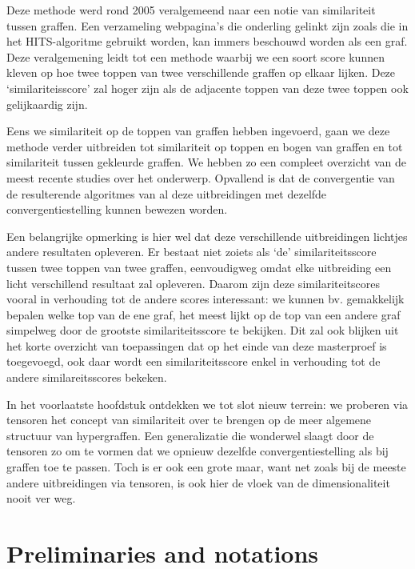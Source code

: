 \documentclass[a4paper,11pt]{report}
\begin{document}
Deze methode werd rond 2005 veralgemeend naar een notie van similariteit tussen 
graffen. Een verzameling webpagina's die onderling gelinkt zijn zoals die in het HITS-algoritme gebruikt worden,
kan immers beschouwd worden als een graf. Deze veralgemening leidt tot een 
methode waarbij we een soort score kunnen kleven op hoe twee toppen van twee verschillende graffen op elkaar lijken. 
Deze `similariteisscore' zal hoger zijn als de adjacente toppen van deze twee toppen 
ook gelijkaardig zijn.

Eens we similariteit op de toppen van graffen hebben ingevoerd, gaan we deze 
methode verder uitbreiden tot similariteit op toppen en bogen van graffen en tot 
similariteit tussen gekleurde graffen. We hebben zo een compleet overzicht van 
de meest recente studies over het onderwerp. Opvallend is dat de convergentie van de resulterende algoritmes van al deze uitbreidingen met 
dezelfde convergentiestelling kunnen bewezen worden.

Een belangrijke opmerking is hier wel dat deze verschillende uitbreidingen lichtjes 
andere resultaten opleveren. Er bestaat niet zoiets als `de' similariteitsscore tussen twee 
toppen van twee graffen, eenvoudigweg omdat elke uitbreiding een licht verschillend resultaat zal opleveren.
Daarom zijn deze similariteitscores vooral in verhouding tot de andere scores interessant: we kunnen 
bv. gemakkelijk bepalen welke top van de ene graf, het meest lijkt op de top van een andere 
graf simpelweg door de grootste similariteitsscore te bekijken.    Dit zal ook blijken uit het korte overzicht van toepassingen dat op 
het einde van deze masterproef is toegevoegd, ook daar wordt een
similariteitsscore enkel in verhouding tot de andere similareitsscores bekeken.

In het voorlaatste hoofdstuk ontdekken we tot slot nieuw terrein: we proberen 
via tensoren het concept van similariteit over te brengen op de meer algemene 
structuur van hypergraffen. Een generalizatie die wonderwel slaagt door de tensoren zo om te vormen dat we opnieuw dezelfde convergentiestelling als bij graffen toe te 
passen. Toch is er ook een grote maar, want net zoals bij de meeste andere
uitbreidingen via tensoren, is ook hier de vloek van de dimensionaliteit nooit ver weg. 


 

\tableofcontents
\newpage
\chapter{Preliminaries and notations}
\end{document}
